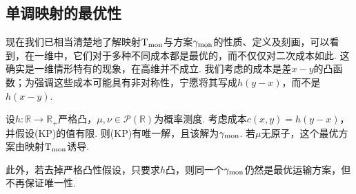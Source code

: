\subsection{单调映射的最优性}\label{sec:2.2}

现在我们已相当清楚地了解映射$\mathrm T_{\rm mon}$与方案$\gamma_{\rm mon}$的性质、定义及刻画，可以看到，在一维中，它们对于多种不同成本都是最优的，而不仅仅对二次成本如此. 这确实是一维情形特有的现象，在高维并不成立. 我们考虑的成本是差$x-y$的凸函数；为强调这些成本可能具有非对称性，宁愿将其写成$h(y-x)$，而不是$h(x-y)$.

\begin{theorem}\label{obj:2.9}
设$h:\mathbb R\to\mathbb R_+$严格凸，$\mu,\nu\in\mathscr P(\mathbb R)$为概率测度. 考虑成本$c(x,y)=h(y-x)$，并假设(KP)的值有限. 则(KP)有唯一解，且该解为$\gamma_{\rm mon}$. 若$\mu$无原子，这个最优方案由映射$\mathrm T_{\rm mon}$诱导.

此外，若去掉严格凸性假设，只要求$h$凸，则同一个$\gamma_{\rm mon}$仍然是最优运输方案，但不再保证唯一性.
\end{theorem}
